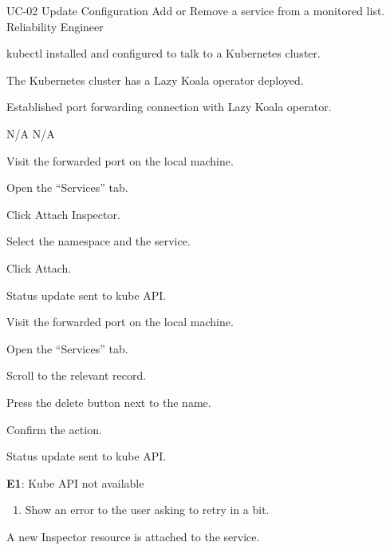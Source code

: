 \vspace{-2em}
\UseCaseDescription
{UC-02}
{Update Configuration}
{Add or Remove a service from a monitored list.}
{Reliability Engineer}
{\begin{CompactItemizes}
    \item kubectl installed and configured to talk to a Kubernetes cluster.
    \item The Kubernetes cluster has a Lazy Koala operator deployed.
    \item Established port forwarding connection with Lazy Koala operator.
\end{CompactItemizes}}
{N/A}
{N/A}
{\begin{CompactEnumerate}
    \item Visit the forwarded port on the local machine.
    \item Open the “Services” tab.
    \item Click Attach Inspector.
    \item Select the namespace and the service.
    \item Click Attach.
    \item Status update sent to kube API.
\end{CompactEnumerate}}
{{\begin{CompactEnumerate}
    \item Visit the forwarded port on the local machine.
    \item Open the “Services” tab.
    \item Scroll to the relevant record.
    \item Press the delete button next to the name.
    \item Confirm the action.
    \item Status update sent to kube API.
\end{CompactEnumerate}}
{\textbf{E1}: Kube API not available
\vspace{-4mm}\begin{enumerate}
    \item Show an error to the user asking to retry in a bit.
\vspace{-7mm}\end{enumerate}}
{\begin{CompactItemizes}
    \item A new Inspector resource is attached to the service.
\end{CompactItemizes}}}

